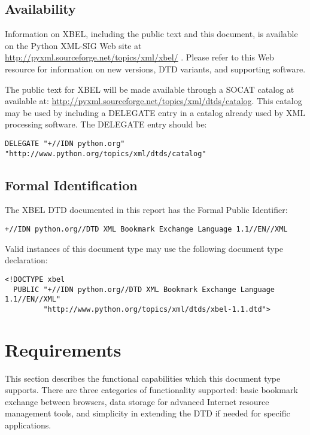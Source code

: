 \documentclass{howto}
\begin{document}
  \subsection{Availability
              \label{availability}}

    Information on XBEL, including the public text and this document,
    is available on the Python XML-SIG Web site at
    \url{http://pyxml.sourceforge.net/topics/xml/xbel/} \cite{xbel-home}.
    Please refer to this Web resource for information on new versions,
    DTD variants, and supporting software.

    The public text for XBEL will be made available through a SOCAT
    catalog at available at:
    \url{http://pyxml.sourceforge.net/topics/xml/dtds/catalog}.  This
    catalog may be used by including a DELEGATE entry in a catalog
    already used by XML processing software.  The DELEGATE entry
    should be:

\begin{verbatim}
DELEGATE "+//IDN python.org" "http://www.python.org/topics/xml/dtds/catalog"
\end{verbatim}


  \subsection{Formal Identification
              \label{formal-ident}}

    The XBEL DTD documented in this report has the Formal Public
    Identifier:

\begin{verbatim}
+//IDN python.org//DTD XML Bookmark Exchange Language 1.1//EN//XML
\end{verbatim}

    Valid instances of this document type may use the following document
    type declaration:

\begin{verbatim}
<!DOCTYPE xbel
  PUBLIC "+//IDN python.org//DTD XML Bookmark Exchange Language 1.1//EN//XML"
         "http://www.python.org/topics/xml/dtds/xbel-1.1.dtd">
\end{verbatim}


\section{Requirements
         \label{requirements}}

  This section describes the functional capabilities which this
  document type supports.  There are three categories of
  functionality supported:  basic bookmark exchange between browsers,
  data storage for advanced Internet resource management tools, and
  simplicity in extending the DTD if needed for specific
  applications.
\end{document}
